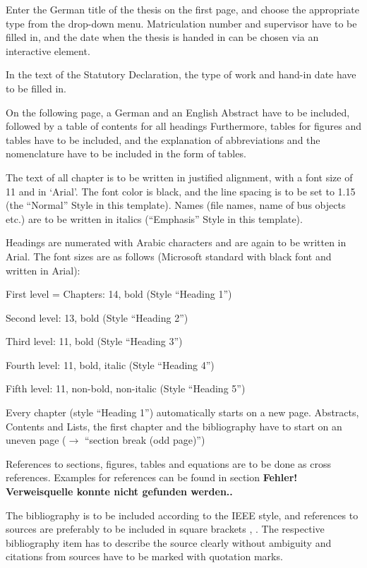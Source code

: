 \documentclass[11pt, a4paper, twoside]{report}
\begin{document}
Enter the German title of the thesis on the first page, and choose the appropriate type from the drop-down menu. Matriculation number and supervisor have to be filled in, and the date when the thesis is handed in can be chosen via an interactive element.

In the text of the Statutory Declaration, the type of work and hand-in date have to be filled in.

On the following page, a German and an English Abstract have to be included, followed by a table of contents for all headings Furthermore, tables for figures and tables have to be included, and the explanation of abbreviations and the nomenclature have to be included in the form of tables.

The text of all chapter is to be written in justified alignment, with a font size of 11 and in ‘Arial’. The font color is black, and the line spacing is to be set to 1.15 (the “Normal” Style in this template). Names (file names, name of bus objects etc.) are to be written in italics (“Emphasis” Style in this template).

Headings are numerated with Arabic characters and are again to be written in Arial. The font sizes are as follows (Microsoft standard with black font and written in Arial):
\begin{description}[labelindent=1cm, topsep=0pt, noitemsep]
	\item First level = Chapters: 14, bold (Style “Heading 1”)
	\item Second level: 13, bold (Style “Heading 2”)
	\item Third level: 11, bold (Style “Heading 3”)
	\item Fourth level: 11, bold, italic (Style “Heading 4”)
	\item Fifth level: 11, non-bold, non-italic (Style “Heading 5”)
\end{description}
Every chapter (style ``Heading 1'') automatically starts on a new page. Abstracts, Contents and Lists, the first chapter and the bibliography have to start on an uneven page ($\rightarrow$ ``section break (odd page)'') 

References to sections, figures, tables and equations are to be done as cross references. Examples for references can be found in section \textbf{Fehler! Verweisquelle konnte nicht gefunden werden..}

The bibliography is to be included according to the IEEE style, and references to sources are preferably to be included in square brackets \cite{Handbook}, \cite{Cooper}. The respective bibliography item has to describe the source clearly without ambiguity and citations from sources have to be marked with quotation marks.
\end{document}
